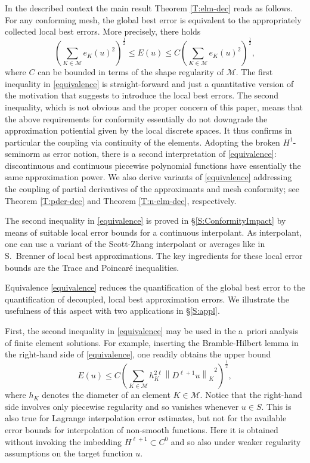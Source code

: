 \documentclass[a4paper]{amsart}
\numberwithin{equation}{section}
\theoremstyle{plain}
\theoremstyle{definition}
\begin{document}
In the described context the main result Theorem \ref{T:elm-dec} reads as 
follows.  For any conforming mesh, the global best error is equivalent to the 
appropriately collected local best errors.  More precisely, there holds
\begin{equation}
\label{equivalence}
 \left(
  \sum_{{K}\in{\mathcal{M}}} e_{K}(u)^2
 \right)^{\frac12}
 \leq
 E(u)
 \leq
 C\left(
  \sum_{{K}\in{\mathcal{M}}} e_{K}(u)^2
 \right)^{\frac12},
\end{equation}
where $C$ can be bounded in terms of the shape regularity of ${\mathcal{M}}$.  The 
first inequality in \eqref{equivalence} is straight-forward and just a 
quantitative version of the motivation that suggests to introduce the local 
best errors.  The second inequality, which is not obvious and the proper 
concern of this paper, means that the above requirements for conformity 
essentially do not downgrade the approximation potiential given by the local 
discrete spaces.  It thus confirms in particular the coupling via continuity of 
the elements.
Adopting the broken $H^1$-seminorm as error notion, there is a second 
interpretation of \eqref{equivalence}: discontinuous and continuous piecewise 
polynomial functions have essentially the same approximation power.  We also 
derive variants of \eqref{equivalence} addressing the coupling of partial 
derivatives of the approximants and mesh conformity; see Theorem 
\ref{T:pder-dec} and Theorem \ref{T:n-elm-dec}, respectively.

\smallskip The second inequality in \eqref{equivalence} is proved in 
\S\ref{S:ConformityImpact} by means of suitable local error bounds for a 
continuous interpolant.  As interpolant, one can use a variant of the 
Scott-Zhang interpolant \cite{Scott.Zhang:90} or averages like in S.~Brenner 
\cite{Brenner:96} of local best approximations.  The key ingredients for these 
local error bounds are the Trace and Poincar\'e inequalities.

\medskip Equivalence \eqref{equivalence} reduces the quantification of
the global best error to the quantification of decoupled, local best
approximation errors.  We illustrate the usefulness of this aspect
with two applications in \S\ref{S:appl}.

First, the second inequality in \eqref{equivalence} may be used in the
{a~priori\xspace} analysis of finite element solutions.  For example, inserting
the Bramble-Hilbert lemma in the right-hand side of \eqref{equivalence}, one 
readily obtains the upper bound
\begin{equation}
\label{apriori-ub}
 E(u)
 \leq
 C \left(
  \sum_{{K}\in{\mathcal{M}}} h_{K}^{2\ell}
   {\left\|{D^{\ell+1} u}\right\|_{{K}}}^2
 \right)^{\frac12},
\end{equation}
where $h_{K}$ denotes the diameter of an element ${K}\in{\mathcal{M}}$.  Notice that 
the right-hand side involves only piecewise regularity and so vanishes whenever
$u\in{S}$.  This is also true for Lagrange interpolation error estimates, 
but not for the available error bounds \cite{Clement:75,Scott.Zhang:90} for 
interpolation of non-smooth functions.  Here it is obtained without invoking 
the imbedding $H^{\ell+1}\subset C^0$ and so also under weaker regularity 
assumptions on the target function $u$. 
\end{document}
